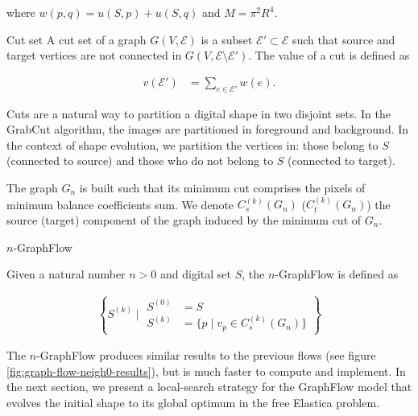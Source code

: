 where $w(p,q) = u(S,p) + u(S,q)$ and $M=\pi^2 R^4$. 

\begin{definition}{Cut set}
 A cut set of a graph $G(V,\mathcal{E})$ is a subset $\mathcal{E}' \subset \mathcal{E}$ such that source and target vertices are not connected in $G(V,\mathcal{E} \setminus \mathcal{E}')$. The value of a cut is defined as
 
 \begin{align*}
 	v(\mathcal{E}') &= \sum_{e \in \mathcal{E}'}{w(e)}.
 \end{align*}
 
\end{definition}

Cuts are a natural way to partition a digital shape in two disjoint sets. In the GrabCut algorithm, the images are partitioned in foreground and background. In the context of shape evolution, we partition the vertices in: those belong to $S$ (connected to source) and those who do not belong to $S$ (connected to target).

The graph $G_n$ is built such that its minimum cut comprises the pixels of minimum balance coefficients sum. We denote $C_s^{(k)}(G_n)$ ($C_t^{(k)}(G_n)$) the source (target) component of the graph induced by the minimum cut of $G_n$. 

\begin{definition}{$n$-GraphFlow}

Given a natural number $n>0$ and digital set $S$, the $n$-GraphFlow is defined as

\begin{align*}
	\left \{ S^{(k)} \; | \; \begin{array}{ll}
	S^{(0)}&=S \\
	S^{(k)}&= \{ p \; | \; v_p \in C_s^{(k)}(G_n) \}
	\end{array} \right\}
\end{align*}

\end{definition}

The $n$-GraphFlow produces similar results to the previous flows (see figure \ref{fig:graph-flow-neigh0-results}), but is much faster to compute and implement. In the next section, we present a local-search strategy for the GraphFlow model that evolves the initial shape to its global optimum in the free Elastica problem.

